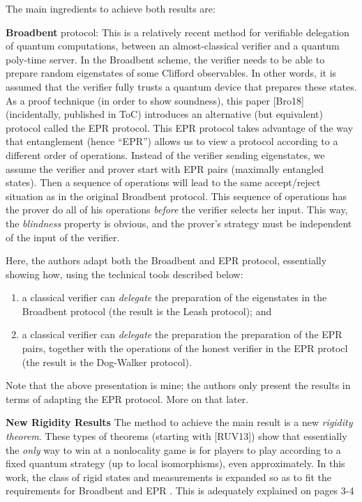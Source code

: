 \documentclass[11pt]{article}
\newcommand{\DW}{{\sf Dog-Walker }}
\newcommand{\Leash}{{\sf Leash }}
\newcommand{\Broad}{{\sf Broadbent }}
\newcommand{\EPR}{{\sf EPR }}
\begin{document}
The main ingredients to achieve both results are:

\textbf{Broadbent} protocol: This is a relatively recent method for verifiable delegation of  quantum computations, between an almost-classical verifier and a quantum poly-time server. In the \Broad scheme, the verifier needs to be able to prepare random eigenstates of some Clifford observables. In other words, it is assumed that the verifier fully trusts a quantum device that prepares these states. As a proof technique (in order to show soundness), this paper [Bro18] (incidentally, published in ToC) introduces an alternative (but equivalent) protocol called the \EPR protocol. This \EPR protocol takes advantage of the way that entanglement (hence ``EPR'') allows us to view a protocol according to a different order of operations. Instead of the verifier sending eigenstates, we assume the verifier and prover start with EPR pairs (maximally entangled states). Then a sequence of operations will lead to the same accept/reject situation as in the original \Broad protocol. This sequence of operations has the prover do all of his operations \emph{before} the verifier selects her input. This way, the \emph{blindness} property is obvious, and the prover's strategy must be independent of the input of the verifier.

Here, the authors adapt both the \Broad and \EPR protocol, essentially showing how, using the technical tools described below:
\begin{enumerate} \item a classical verifier can \emph{delegate} the preparation of the eigenstates in the \Broad protocol (the result is the \Leash protocol); and
\item a classical verifier can \emph{delegate} the preparation the preparation of the EPR pairs, together with the operations of the honest verifier in the \EPR protocl (the result is the \DW protocol).
    \end{enumerate}
    Note that the above presentation is mine; the authors only present the results in terms of adapting the \EPR protocol. More on that later.

\textbf{New Rigidity Results}
The method to achieve the main result is a new \emph{rigidity theorem}. These types of theorems (starting with [RUV13]) show that essentially the \emph{only} way to win at a nonlocality game is for players to play according to a fixed quantum strategy (up to local isomorphisms), even approximately. In this work, the class of rigid states and measurements is expanded so as to fit the requirements for \Broad and \EPR. This is adequately explained on pages 3-4
\end{document}
